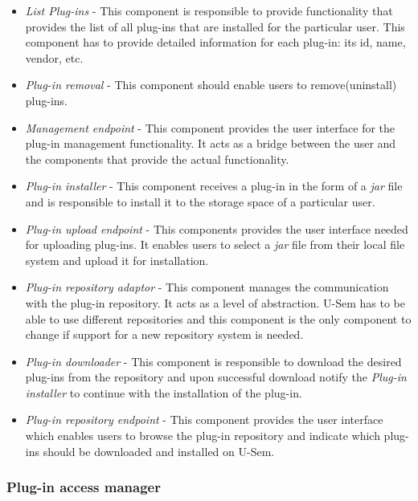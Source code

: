 \begin{itemize}

\item \textit{List Plug-ins} - This component is responsible to provide functionality that provides the list of all plug-ins that are installed for the particular user. This component has to provide detailed information for each plug-in: its id, name, vendor, etc.

\item \textit{Plug-in removal} - This component should enable users to remove(uninstall) plug-ins.  

\item \textit{Management endpoint} - This component provides the user interface for the plug-in management functionality. It acts as a bridge between the user and the components that provide the actual functionality. 

\item \textit{Plug-in installer} - This component receives a plug-in in the form of a \textit{jar} file and is responsible to install it to the storage space of a particular user.

\item \textit{Plug-in upload endpoint} - This components provides the user interface needed for uploading plug-ins. It enables users to select a \textit{jar} file from their local file system and upload it for installation.

\item \textit{Plug-in repository adaptor} - This component manages  the communication with the plug-in repository. It acts as a level of abstraction. U-Sem has to be able to use different repositories and this component is the only component to change if support for a new repository system is needed. 

\item \textit{Plug-in downloader} - This component is responsible to download the desired plug-ins from the repository and upon successful download notify the \textit{Plug-in installer} to continue with the  installation of the plug-in.

\item \textit{Plug-in repository endpoint} - This component provides the user interface which enables users to browse the plug-in repository and indicate which plug-ins should be downloaded and installed on U-Sem.

\end{itemize}


\subsubsection{Plug-in access manager}

